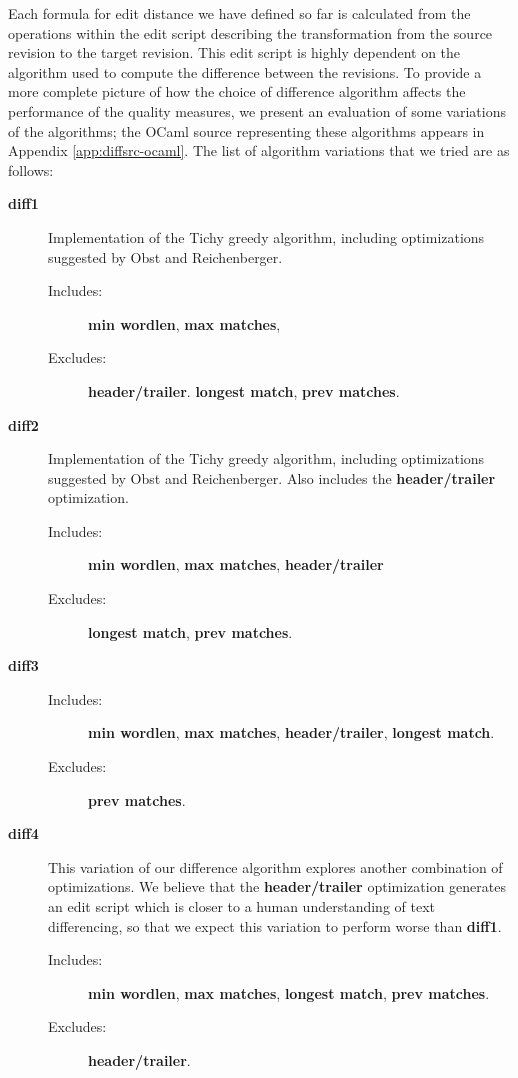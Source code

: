 Each formula for edit distance we have defined so far is calculated
from the operations within the edit script describing the transformation
from the source revision to the target revision.
This edit script is highly dependent on the algorithm used to
compute the difference between the revisions.
To provide a more complete picture of how the choice of difference
algorithm affects the performance of the quality measures,
we present an evaluation of some variations of the algorithms;
the OCaml source representing these algorithms appears
in Appendix \ref{app:diffsrc-ocaml}.
The list of algorithm variations that we tried are as follows:
%
\begin{description}

\item[\textbf{diff1}]
    Implementation of the Tichy greedy algorithm, including optimizations
    suggested by Obst and Reichenberger.
    \begin{description}
    \item[Includes:]
        \textbf{min wordlen}, \textbf{max matches},
    \item[Excludes:]
        \textbf{header/trailer}.
        \textbf{longest match}, \textbf{prev matches}.
    \end{description}

\item[\textbf{diff2}]
    Implementation of the Tichy greedy algorithm, including optimizations
    suggested by Obst and Reichenberger.  Also includes the
    \textbf{header/trailer} optimization.
    \begin{description}
    \item[Includes:]
        \textbf{min wordlen}, \textbf{max matches}, \textbf{header/trailer}
    \item[Excludes:]
        \textbf{longest match}, \textbf{prev matches}.
    \end{description}

\item[\textbf{diff3}]
    \begin{description}
    \item[Includes:]
	\textbf{min wordlen}, \textbf{max matches},
	\textbf{header/trailer}, \textbf{longest match}.
    \item[Excludes:]
	\textbf{prev matches}.
    \end{description}

\item[\textbf{diff4}]
    This variation of our difference algorithm explores another
    combination of optimizations.
    We believe that the \textbf{header/trailer} optimization generates
    an edit script which is closer to a human understanding of text
    differencing, so that we expect this variation to perform worse
    than \textbf{diff1}.
    \begin{description}
    \item[Includes:]
	\textbf{min wordlen}, \textbf{max matches}, \textbf{longest match},
	\textbf{prev matches}.
    \item[Excludes:]
	\textbf{header/trailer}.
    \end{description}


\end{description}
